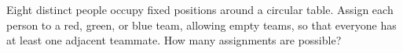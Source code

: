 Eight distinct people occupy fixed positions around a circular table. Assign each person to a red, green, or blue team, allowing empty teams, so that everyone has at least one adjacent teammate. How many assignments are possible?
